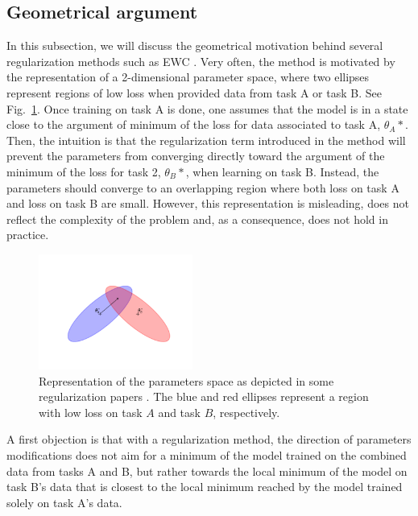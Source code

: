 \documentclass[11pt]{article}
\begin{document}
\subsection{Geometrical argument}


In this subsection, we will discuss the geometrical motivation behind several regularization methods such as EWC \cite{EWC_nuts_and_bolts}\cite{EWC_0}. Very often, the method is motivated by the representation of a 2-dimensional parameter space, where two ellipses represent regions of low loss when provided data from task A or task B. See Fig.~\ref{fig:ellipses_EWC}. Once training on task A is done, one assumes that the model is in a state close to the argument of minimum of the loss for data associated to task A, $\theta_A*$. Then, the intuition is that the regularization term introduced in the method will prevent the parameters from converging directly toward the argument of the minimum of the loss for task 2, $\theta_B*$, when learning on task B. Instead, the parameters should converge to an overlapping region where both loss on task A and loss on task B are small. However, this representation is misleading, does not reflect the complexity of the problem and, as a consequence, does not hold in practice. 

\begin{figure}
    \centering
    \includegraphics[width=0.45\textwidth]{images/ellipse_overlap.png}
    \caption{Representation of the parameters space as depicted in some regularization papers \cite{EWC_0}\cite{EWC_nuts_and_bolts}. The blue and red ellipses represent a region with low loss on task $A$ and task $B$, respectively.}
    \label{fig:ellipses_EWC}
\end{figure}

\vspace{2mm}
\noindent
A first objection is that with a regularization method, the direction of parameters modifications does not aim for a minimum of the model trained on the combined data from tasks A and B, but rather towards the local minimum of the model on task B's data that is closest to the local minimum reached by the model trained solely on task A's data.
\end{document}
